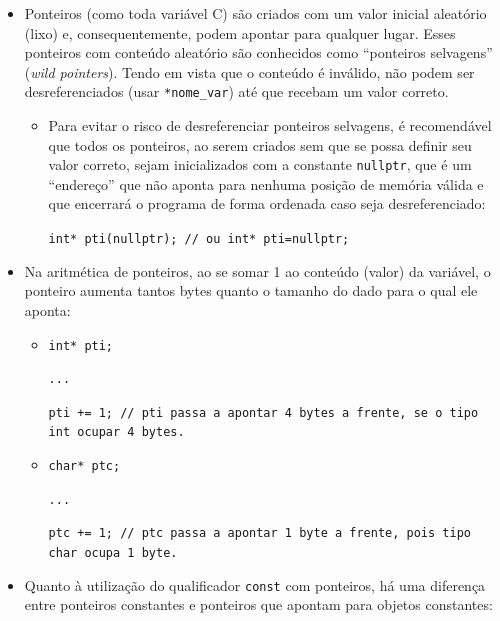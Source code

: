 \documentclass{article}
\begin{document}
	\noindent\fbox{\usebox{\caixadecodigo}}
	
	\vspace{1.5em}
	
	\begin{itemize}
		\item Ponteiros (como toda variável C) são criados com um valor inicial aleatório (lixo) e, consequentemente, podem apontar para qualquer lugar. Esses ponteiros com conteúdo aleatório são conhecidos como ``ponteiros selvagens'' (\textit{wild pointers}). Tendo em vista que o conteúdo é inválido, não podem ser desreferenciados (usar \texttt{*nome\_var}) até que recebam um valor correto.
		\begin{itemize}
			\item Para evitar o risco de desreferenciar ponteiros selvagens, é recomendável que todos os ponteiros, ao serem criados sem que se possa definir seu valor correto, sejam inicializados com a constante \texttt{nullptr}, que é um ``endereço'' que não aponta para nenhuma posição de memória válida e que encerrará o programa de forma ordenada caso seja desreferenciado:
			
			\texttt{int* pti(nullptr); \quad // ou int* pti=nullptr;}
		\end{itemize}
		
		\item Na aritmética de ponteiros, ao se somar 1 ao conteúdo (valor) da variável, o ponteiro aumenta tantos bytes quanto o tamanho do dado para o qual ele aponta:
		\begin{itemize}
			\item \texttt{int* pti;}
			
			\texttt{...}
			
			\texttt{pti += 1; \quad // pti passa a apontar 4 bytes a frente, se o tipo int ocupar 4 bytes.}
			
			\vspace{0.5em}
			
			\item \texttt{char* ptc;}
			
			\texttt{...}
			
			\texttt{ptc += 1; \quad // ptc passa a apontar 1 byte a frente, pois tipo char ocupa 1 byte.}
		\end{itemize}
		
		\item Quanto à utilização do qualificador \texttt{const} com ponteiros, há uma diferença entre ponteiros constantes e ponteiros que apontam para objetos constantes:
	\end{itemize}
	
\end{document}
